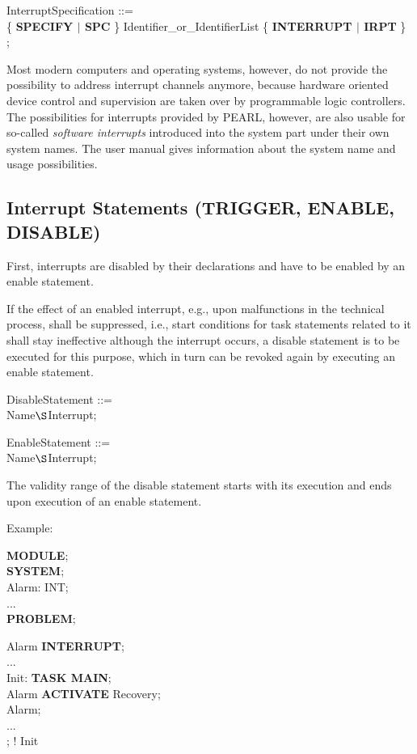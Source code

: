 InterruptSpecification ::=\\
\x \{ {\bf SPECIFY $\mid$ SPC} \} Identifier\_or\_IdentifierList \{ {\bf INTERRUPT $\mid$ IRPT} \}\\
\x [ GlobalAttribute ];

Most modern computers and operating systems, however, do not provide the
possibility to address interrupt channels anymore, because hardware
oriented device control and supervision are taken over by programmable
logic controllers. The possibilities for interrupts provided by PEARL,
however, are also usable for so-called {\em software interrupts}
introduced into the system part under their own system names. The user manual
gives information about the system name and usage possibilities.

\subsection{Interrupt Statements (TRIGGER, ENABLE, DISABLE)}    %

First, interrupts are disabled by their declarations and have to be
enabled by an enable statement.

If the effect of an enabled interrupt, e.g., upon malfunctions in the
technical process, shall be suppressed, i.e., start conditions for task
statements related to it shall stay ineffective although the interrupt
occurs, a disable statement is to be executed for this purpose, which
in turn can be revoked again by executing an enable statement.

DisableStatement ::= \\
 Name$\S $Interrupt;

EnableStatement ::=  \\
 Name$\S $Interrupt;

The validity range of the disable statement starts with its
execution and ends upon execution of an enable statement.

Example:

{\bf MODULE};\\
{\bf SYSTEM};\\
\x Alarm: INT;\\
\x ...\\
{\bf PROBLEM};

 Alarm {\bf INTERRUPT};\\
\x ...\\
\x Init: {\bf TASK MAIN};\\
\x {} Alarm {\bf ACTIVATE} Recovery;\\
\x {} Alarm;\\
\x \x ... \\
\x {}; ! Init

